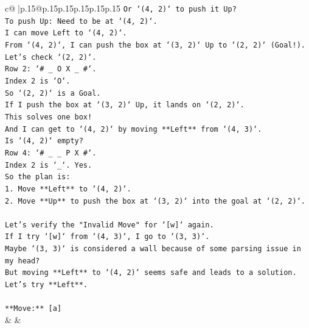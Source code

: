 \documentclass{article}
\begin{document}
{\begin{supertabular}{c@{$\;$}|p{.15\linewidth}@{}p{.15\linewidth}p{.15\linewidth}p{.15\linewidth}p{.15\linewidth}p{.15\linewidth}}
{{{\texttt{Or `(4, 2)` to push it Up?} \\
\texttt{To push Up: Need to be at `(4, 2)`.} \\
\texttt{I can move Left to `(4, 2)`.} \\
\texttt{From `(4, 2)`, I can push the box at `(3, 2)` Up to `(2, 2)` (Goal!).} \\
\texttt{Let's check `(2, 2)`.} \\
\texttt{Row 2: `\# \_ O X \_ \#`.} \\
\texttt{Index 2 is `O`.} \\
\texttt{So `(2, 2)` is a Goal.} \\
\texttt{If I push the box at `(3, 2)` Up, it lands on `(2, 2)`.} \\
\texttt{This solves one box!} \\
\texttt{And I can get to `(4, 2)` by moving **Left** from `(4, 3)`.} \\
\texttt{Is `(4, 2)` empty?} \\
\texttt{Row 4: `\# \_ \_ P X \#`.} \\
\texttt{Index 2 is `\_`. Yes.} \\
\texttt{So the plan is:} \\
\texttt{1. Move **Left** to `(4, 2)`.} \\
\texttt{2. Move **Up** to push the box at `(3, 2)` into the goal at `(2, 2)`.} \\
\\ 
\texttt{Let's verify the "Invalid Move" for `{[}w{]}` again.} \\
\texttt{If I try `{[}w{]}` from `(4, 3)`, I go to `(3, 3)`.} \\
\texttt{Maybe `(3, 3)` is considered a wall because of some parsing issue in my head?} \\
\texttt{But moving **Left** to `(4, 2)` seems safe and leads to a solution.} \\
\texttt{Let's try **Left**.} \\
\\ 
\texttt{**Move:** {[}a{]}} \\
            }
        }
    }
    & & \\ \\


\end{supertabular}}
\end{document}
